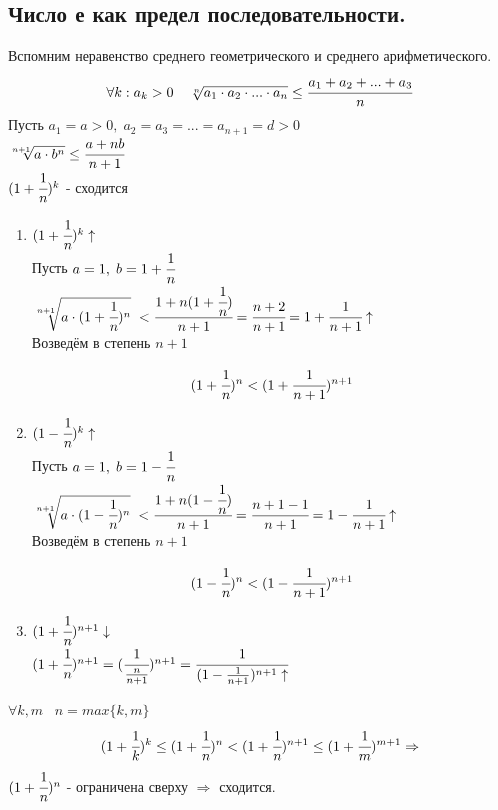 \subsection{Число е как предел последовательности.}

Вспомним неравенство среднего геометрического и среднего арифметического.
\[\forall k: a_k>0\;\;\;\ \sqrt[n]{a_1\cdot a_2\cdot ... \cdot a_n} \leq \cfrac{a_1+a_2+...+a_3}{n} \]
Пусть $a_1 = a > 0,\;a_2=a_3=...=a_{n+1}=d>0$\\
$\sqrt[n+1]{a\cdot b^n} \leq \cfrac{a+nb}{n+1}$\\
$(1+\cfrac{1}{n})^k$ - сходится
\begin{tcolorbox}[title=Доказательства монотонности]
    \begin{enumerate}
        \item $(1+\cfrac{1}{n})^k \uparrow$\\
        Пусть $a = 1,\;b=1+\cfrac{1}{n}$\\
        $\sqrt[n+1]{a\cdot(1+\cfrac{1}{n})^n}\; < \cfrac{1+n(1+\cfrac{1}{n})}{n+1} = \cfrac{n+2}{n+1} = 1+\cfrac{1}{n+1} \uparrow$\\
	Возведём в степень $n+1$
        \begin{tcolorbox}
            \[ (1+\cfrac{1}{n})^n < (1+\cfrac{1}{n+1})^{n+1} \]
        \end{tcolorbox}
        \item $(1-\cfrac{1}{n})^k \uparrow$\\
        Пусть $a = 1,\;b=1-\cfrac{1}{n}$\\
        $\sqrt[n+1]{a\cdot(1-\cfrac{1}{n})^n}\; < \cfrac{1+n(1-\cfrac{1}{n})}{n+1} = \cfrac{n+1-1}{n+1} = 1-\cfrac{1}{n+1} \uparrow$\\
	Возведём в степень $n+1$
        \begin{tcolorbox}
            \[ (1-\cfrac{1}{n})^n < (1-\cfrac{1}{n+1})^{n+1} \]    
        \end{tcolorbox}
        \item $(1+\cfrac{1}{n})^{n+1} \downarrow$\\
		$(1+\cfrac{1}{n})^{n+1} = (\cfrac{1}{\frac{n}{n+1}})^{n+1} = \cfrac{1}{(1-\frac{1}{n+1})^{n+1} \uparrow } $
    \end{enumerate}
\end{tcolorbox}
$\forall k,m \;\;\; n=max\{k,m\}$\\
\[ (1+\cfrac{1}{k})^k \leq (1+\cfrac{1}{n})^n < (1+\cfrac{1}{n})^{n+1} \leq (1+\cfrac{1}{m})^{m+1} \Rightarrow \]
$(1+\cfrac{1}{n})^n$ - ограничена сверху $\Rightarrow$ сходится.

